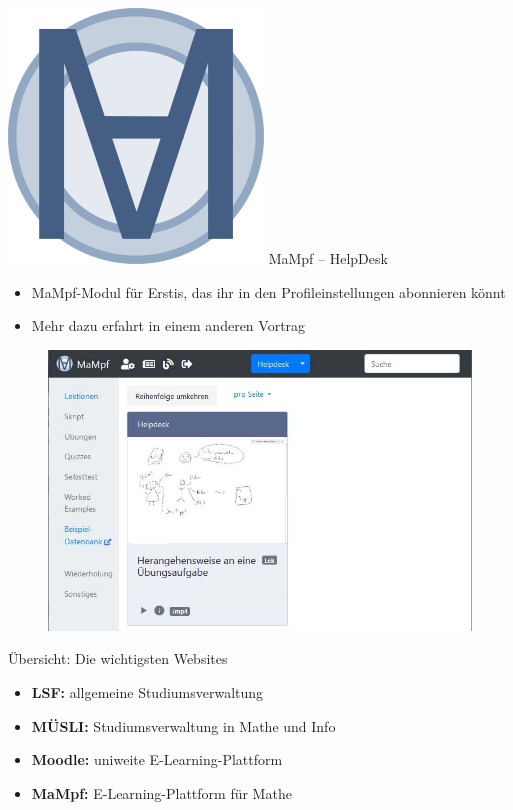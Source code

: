 \begin{frame}{\includegraphics[scale=0.072]{images/mampf.png} MaMpf -- HelpDesk}
      \begin{itemize}
            \item{MaMpf-Modul für Erstis, das ihr in den Profileinstellungen
            abonnieren könnt}
            \item{Mehr dazu erfahrt in einem anderen Vortrag}
      \end{itemize}
      \begin{figure}
            \centering
            \includegraphics[scale=0.35]{images/mampf27.jpg}
      \end{figure}
\end{frame}

\begin{frame}{Übersicht: Die wichtigsten Websites}
    \large
    \begin{itemize}
        \item \textbf{LSF:} allgemeine Studiumsverwaltung
        \item \textbf{MÜSLI:} Studiumsverwaltung in Mathe und Info
        \item \textbf{Moodle:} uniweite E-Learning-Plattform
        \item \textbf{MaMpf:} E-Learning-Plattform für Mathe
    \end{itemize}
\end{frame}

